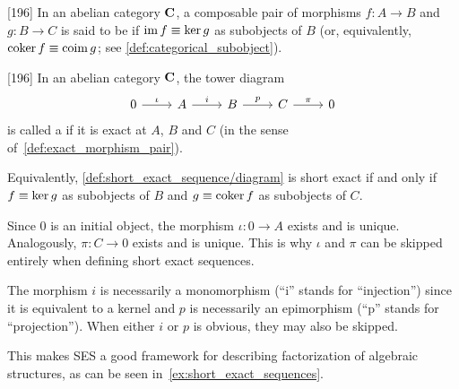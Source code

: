 \begin{definition}\label{def:exact_morphism_pair}\cite{MacLane1994}[196]
  In an abelian category \( \operatorname{\mathbf{C}} \), a composable pair of morphisms \( f: A \to B \) and \( g: B \to C \) is said to be  if \( \operatorname{im} f \equiv \operatorname{ker} g \) as subobjects of \( B \) (or, equivalently, \( \operatorname{coker} f \equiv \operatorname{coim} g \); see \cref{def:categorical_subobject}).
\end{definition}

\begin{definition}\label{def:short_exact_sequence}\cite{MacLane1994}[196]
  In an abelian category \( \operatorname{\mathbf{C}} \), the tower diagram
  \begin{equation}\label{def:short_exact_sequence/diagram}
    \begin{tikzcd}[baseline=(current bounding box.center)]
      0 \arrow[r, "\iota"] & A \arrow[r, "i"] & B \arrow[r, "p"] & C \arrow[r, "\pi"] & 0
    \end{tikzcd}
  \end{equation}
  is called a  if it is exact at \( A \), \( B \) and \( C \) (in the sense of~\cref{def:exact_morphism_pair}).

  Equivalently, \cref{def:short_exact_sequence/diagram} is short exact if and only if \( f \equiv \operatorname{ker} g \) as subobjects of \( B \) and \( g \equiv \operatorname{coker} f \) as subobjects of \( C \).
\end{definition}

\begin{note}\label{note:short_exact_sequence_factorization}
  Since \( 0 \) is an initial object, the morphism \( \iota: 0 \to A \) exists and is unique. Analogously, \( \pi: C \to 0 \) exists and is unique. This is why \( \iota \) and \( \pi \) can be skipped entirely when defining short exact sequences.

  The morphism \( i \) is necessarily a monomorphism (\enquote{i} stands for \enquote{injection}) since it is equivalent to a kernel and \( p \) is necessarily an epimorphism (\enquote{p} stands for \enquote{projection}). When either \( i \) or \( p \) is obvious, they may also be skipped.

  This makes SES a good framework for describing factorization of algebraic structures, as can be seen in~\cref{ex:short_exact_sequences}.
\end{note}

